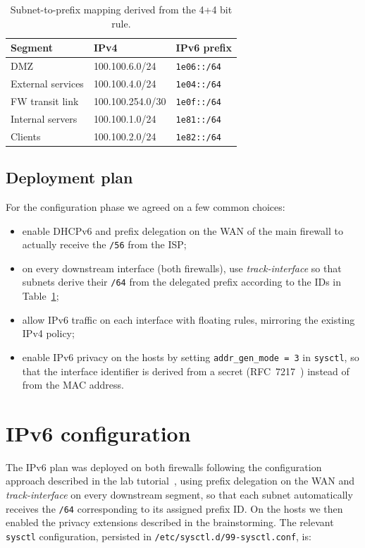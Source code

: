 \documentclass[twocolumn]{NobArticle}
\begin{document}
\begin{table}[H]
\centering
\begin{tabular}{lll}
\toprule
\textbf{Segment} & \textbf{IPv4} & \textbf{IPv6 prefix} \\
\midrule
DMZ                 & 100.100.6.0/24   & \texttt{1e06::/64} \\
External services   & 100.100.4.0/24   & \texttt{1e04::/64} \\
FW transit link     & 100.100.254.0/30 & \texttt{1e0f::/64} \\
Internal servers    & 100.100.1.0/24   & \texttt{1e81::/64} \\
Clients             & 100.100.2.0/24   & \texttt{1e82::/64} \\
\bottomrule
\end{tabular}
\caption{Subnet-to-prefix mapping derived from the 4+4 bit rule.}
\label{tab:prefixes}
\end{table}

\subsection{Deployment plan}

For the configuration phase we agreed on a few common choices:

\begin{itemize}
    \item enable DHCPv6 and prefix delegation on the WAN of the main firewall
    to actually receive the \texttt{/56} from the ISP;
    \item on every downstream interface (both firewalls), use
    \textit{track-interface} so that subnets derive their \texttt{/64} from
    the delegated prefix according to the IDs in Table~\ref{tab:prefixes};
    \item allow IPv6 traffic on each interface with floating rules, mirroring
    the existing IPv4 policy;
    \item enable IPv6 privacy on the hosts by setting
    \texttt{addr\_gen\_mode = 3} in \texttt{sysctl}, so that the interface
    identifier is derived from a secret (RFC~7217~\cite{rfc7217}) instead
    of from the MAC address.
\end{itemize}

\section{IPv6 configuration}

The IPv6 plan was deployed on both firewalls following the configuration
approach described in the lab tutorial~\cite{ipv6video}, using prefix
delegation on the WAN and \textit{track-interface} on every downstream
segment, so that each subnet automatically receives the \texttt{/64}
corresponding to its assigned prefix ID. On the hosts we then enabled the privacy extensions described in
the brainstorming. The relevant \texttt{sysctl} configuration, persisted in
\texttt{/etc/sysctl.d/99-sysctl.conf}, is:
\end{document}
